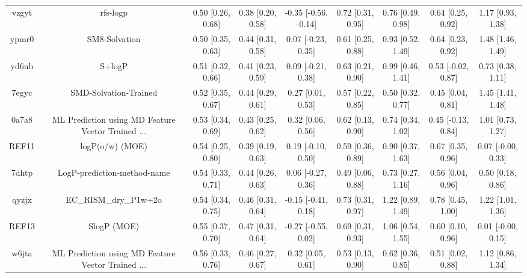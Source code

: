 \documentclass{article}
\begin{document}
\begin{center}
\begin{longtable}{|ccccccccc|}
 vzgyt &                                           rfs-logp &  0.50 [0.26, 0.68] &  0.38 [0.20, 0.58] &  -0.35 [-0.56, -0.14] &  0.72 [0.31, 0.95] &    0.76 [0.49, 0.98] &    0.64 [0.25, 0.92] &     1.17 [0.93, 1.38] \\
 ypmr0 &                                      SM8-Solvation &  0.50 [0.35, 0.63] &  0.44 [0.31, 0.58] &    0.07 [-0.23, 0.35] &  0.61 [0.25, 0.88] &    0.93 [0.52, 1.49] &    0.64 [0.23, 0.92] &     1.48 [1.46, 1.49] \\
 yd6ub &                                             S+logP &  0.51 [0.32, 0.66] &  0.41 [0.23, 0.59] &    0.09 [-0.21, 0.38] &  0.63 [0.21, 0.90] &    0.99 [0.46, 1.41] &   0.53 [-0.02, 0.87] &     0.73 [0.38, 1.11] \\
 7egyc &                              SMD-Solvation-Trained &  0.52 [0.35, 0.67] &  0.44 [0.29, 0.61] &     0.27 [0.01, 0.53] &  0.57 [0.22, 0.85] &    0.50 [0.32, 0.77] &    0.45 [0.04, 0.81] &     1.45 [1.41, 1.48] \\
 0a7a8 &  ML Prediction using MD Feature Vector Trained ... &  0.53 [0.34, 0.69] &  0.43 [0.25, 0.62] &     0.32 [0.06, 0.56] &  0.62 [0.13, 0.90] &    0.74 [0.34, 1.02] &   0.45 [-0.13, 0.84] &     1.01 [0.73, 1.27] \\
 REF11 &                                    logP(o/w) (MOE) &  0.54 [0.25, 0.80] &  0.39 [0.19, 0.63] &    0.19 [-0.10, 0.50] &  0.59 [0.36, 0.89] &    0.90 [0.37, 1.63] &    0.67 [0.35, 0.96] &    0.07 [-0.00, 0.33] \\
 7dhtp &                        LogP-prediction-method-name &  0.54 [0.33, 0.71] &  0.44 [0.26, 0.63] &    0.06 [-0.27, 0.36] &  0.49 [0.06, 0.88] &    0.73 [0.27, 1.16] &    0.56 [0.04, 0.96] &     0.50 [0.18, 0.86] \\
 qyzjx &                              EC\_RISM\_dry\_P1w+2o &  0.54 [0.34, 0.75] &  0.46 [0.31, 0.64] &   -0.15 [-0.41, 0.18] &  0.73 [0.31, 0.97] &    1.22 [0.89, 1.49] &    0.78 [0.45, 1.00] &     1.22 [1.01, 1.36] \\
 REF13 &                                        SlogP (MOE) &  0.55 [0.37, 0.70] &  0.47 [0.31, 0.64] &   -0.27 [-0.55, 0.02] &  0.69 [0.31, 0.93] &    1.06 [0.54, 1.55] &    0.60 [0.10, 0.96] &    0.01 [-0.00, 0.15] \\
 w6jta &  ML Prediction using MD Feature Vector Trained ... &  0.56 [0.33, 0.76] &  0.46 [0.27, 0.67] &     0.32 [0.05, 0.61] &  0.53 [0.13, 0.90] &    0.62 [0.36, 0.85] &    0.51 [0.02, 0.88] &     1.12 [0.86, 1.34] \\

\end{longtable}
\end{center}
\end{document}
